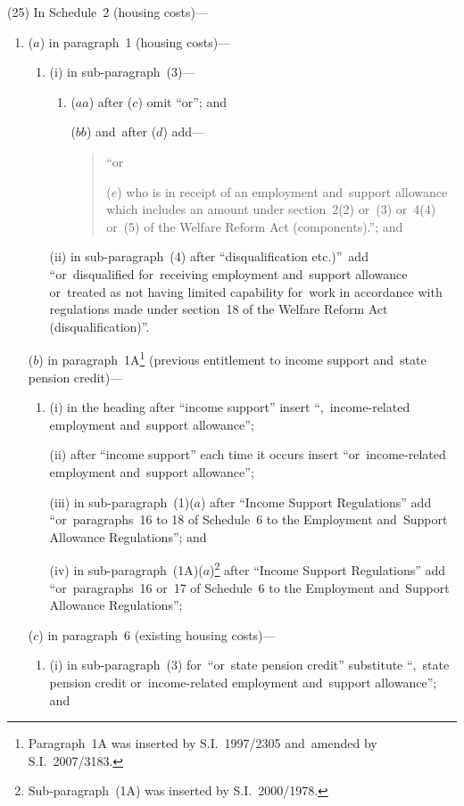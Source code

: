 \documentclass[12pt,a4paper]{article}
\begin{document}
(25) In Schedule~2 (housing costs)—
\begin{enumerate}\item[]
($a$) in paragraph~1 (housing costs)—
\begin{enumerate}\item[]
(i) in sub-paragraph~(3)—
\begin{enumerate}\item[]
($aa$) after ($c$)  omit “or”; and

($bb$) and~after ($d$)  add—
\begin{quotation}
“or

($e$) who is in receipt of an employment and~support allowance which includes an amount under section~2(2) or~(3) or~4(4) or~(5) of the Welfare Reform Act (components).”; and
\end{quotation}
\end{enumerate}

(ii) in sub-paragraph~(4) after “disqualification etc.)”\ add “or~disqualified for~receiving employment and~support allowance or~treated as not having limited capability for~work in accordance with regulations made under section~18 of the Welfare Reform Act (disqualification)”.
\end{enumerate}

($b$) in paragraph~1A\footnote{Paragraph~1A was inserted by S.I.~1997/2305 and~amended by S.I.~2007/3183.} (previous entitlement to income support and~state pension credit)—
\begin{enumerate}\item[]
(i) in the heading after “income support” insert “,~income-related employment and~support allowance”;

(ii) after “income support” each time it occurs insert “or~income-related employment and~support allowance”;

(iii) in sub-paragraph~(1)($a$)  after “Income Support Regulations” add “or~paragraphs~16 to 18 of Schedule~6 to the Employment and~Support Allowance Regulations”; and

(iv) in sub-paragraph~(1A)($a$)\footnote{Sub-paragraph~(1A) was inserted by S.I.~2000/1978.} after “Income Support Regulations” add “or~paragraphs~16 or~17 of Schedule~6 to the Employment and~Support Allowance Regulations”;
\end{enumerate}

($c$) in paragraph~6 (existing housing costs)—
\begin{enumerate}\item[]
(i) in sub-paragraph~(3) for~“or~state pension credit” substitute “,~state pension credit or~income-related employment and~support allowance”; and


\end{enumerate}
\end{enumerate}
\end{document}
